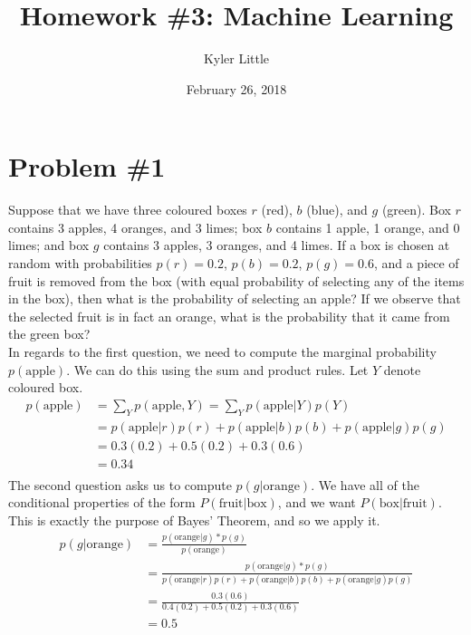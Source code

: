 \documentclass[12pt]{article}
\author{Kyler Little\vspace{-0.6cm}}
\title{Homework \#3: Machine Learning\vspace{-0.3cm}}
\date{February 26, 2018\vspace{-0.7cm}}
\begin{document}
	\maketitle
	\section*{Problem \#1}
	Suppose that we have three coloured boxes $r$ (red), $b$ (blue), and $g$ (green). Box $r$ contains 3 apples, 4 oranges, and 3 limes; box $b$ contains 1 apple, 1 orange, and 0 limes; and box $g$ contains 3 apples, 3 oranges, and 4 limes. If a box is chosen at random with probabilities $p(r) = 0.2$, $p(b) = 0.2$, $p(g) = 0.6$, and a piece of fruit is removed from the box (with equal probability of selecting any of the items in the box), then what is the probability of selecting an apple? If we observe that the selected fruit is in fact an orange, what is the probability that it came from the green box? \\
	In regards to the first question, we need to compute the marginal probability $p(\text{apple})$. We can do this using the sum and product rules. Let $Y$ denote coloured box.
	\begin{align*}
	p(\text{apple}) &= \sum_{Y}^{} p(\text{apple}, Y) = \sum_{Y}^{} p(\text{apple} \vert Y) p(Y) \\
	&= p(\text{apple} \vert r) p(r) + p(\text{apple} \vert b) p(b) + p(\text{apple} \vert g) p(g)\\
	&= 0.3(0.2) + 0.5(0.2) + 0.3(0.6) \\
	&= 0.34\\
	\end{align*}
	The second question asks us to compute $p(g \vert \text{orange})$. We have all of the conditional properties of the form $P(\text{fruit} \vert \text{box})$, and we want $P(\text{box} \vert \text{fruit})$. This is exactly the purpose of Bayes' Theorem, and so we apply it.
	\begin{align*}
	p(g \vert \text{orange}) &= \frac{p(\text{orange} \vert g) * p(g)}{p(\text{orange})} \\
	&= \frac{p(\text{orange} \vert g) * p(g)}{p(\text{orange} \vert r) p(r) + p(\text{orange} \vert b) p(b) + p(\text{orange} \vert g) p(g)}\\
	&= \frac{0.3(0.6)}{0.4(0.2) + 0.5(0.2) + 0.3(0.6)} \\
	&= 0.5
	\end{align*}
	 
\end{document}
